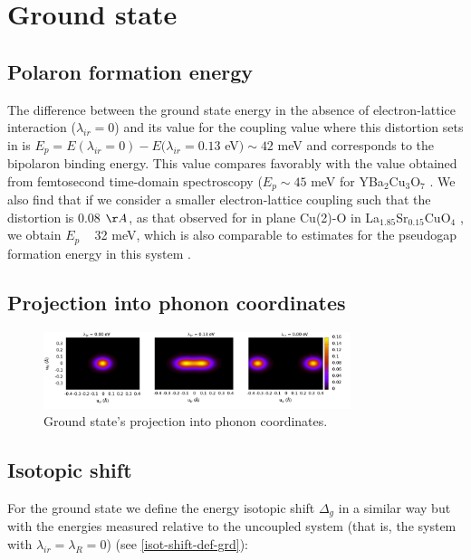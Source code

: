 \chapter{Ground state}

\section{Polaron formation energy}


The difference between the ground state energy in the absence of electron-lattice interaction ($\lambda_{ir}=0$) and its value for the coupling value where this distortion sets in is $E_p =E(\lambda_{ir}=0)−E(\lambda_{ir}=0.13$ eV$) \sim 42$ meV and corresponds to the bipolaron binding energy. This value compares favorably with the value obtained from femtosecond time-domain spectroscopy ($E_p \sim 45$ meV for YBa$_2$Cu$_3$O$_7$ \cite{Demsar1999}. We also find that if we consider a smaller electron-lattice coupling such that the distortion is 0.08 $\AA$, as that observed for in plane Cu(2)-O in La$_{1.85}$Sr$_{0.15}$CuO$_4$ \cite{Bianconi1996}, we obtain $E_p$ ~ 32 meV, which is also comparable to estimates for the pseudogap formation energy in this system \cite{Kusar2005}.

\section{Projection into phonon coordinates}

\begin{figure}[ht!]
\centering
\includegraphics[width=0.8\textwidth]{images/ph-ground.png}
\caption{Ground state's projection into phonon coordinates.}
\label{fig:ph-ground}
\end{figure}

\section{Isotopic shift}

For the ground state we define the energy isotopic shift $\Delta_g$ in a similar way but with the energies measured relative to the uncoupled system (that is, the system with $\lambda_{ir}=\lambda_R=0$) (see \ref{isot-shift-def-grd}):

